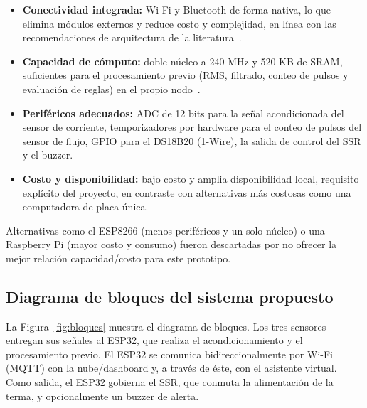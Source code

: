 \documentclass[11pt,a4paper]{article}
\begin{document}
\begin{itemize}
  \item \textbf{Conectividad integrada:} Wi-Fi y Bluetooth de forma nativa, lo que elimina módulos externos y reduce costo y complejidad, en línea con las recomendaciones de arquitectura de la literatura~\cite{stojkoska2017,alfuqaha2015}.
  \item \textbf{Capacidad de cómputo:} doble núcleo a 240 MHz y 520 KB de SRAM, suficientes para el procesamiento previo (RMS, filtrado, conteo de pulsos y evaluación de reglas) en el propio nodo~\cite{shi2016}.
  \item \textbf{Periféricos adecuados:} ADC de 12 bits para la señal acondicionada del sensor de corriente, temporizadores por hardware para el conteo de pulsos del sensor de flujo, GPIO para el DS18B20 (1-Wire), la salida de control del SSR y el buzzer.
  \item \textbf{Costo y disponibilidad:} bajo costo y amplia disponibilidad local, requisito explícito del proyecto, en contraste con alternativas más costosas como una computadora de placa única.
\end{itemize}

Alternativas como el ESP8266 (menos periféricos y un solo núcleo) o una Raspberry Pi (mayor costo y consumo) fueron descartadas por no ofrecer la mejor relación capacidad/costo para este prototipo.

\subsection{Diagrama de bloques del sistema propuesto}
La Figura~\ref{fig:bloques} muestra el diagrama de bloques. Los tres sensores entregan sus señales al ESP32, que realiza el acondicionamiento y el procesamiento previo. El ESP32 se comunica bidireccionalmente por Wi-Fi (MQTT) con la nube/dashboard y, a través de éste, con el asistente virtual. Como salida, el ESP32 gobierna el SSR, que conmuta la alimentación de la terma, y opcionalmente un buzzer de alerta.
\end{document}
